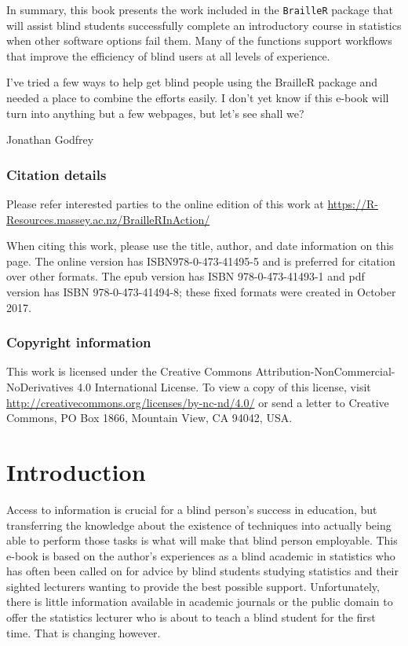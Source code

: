 \documentclass[
]{book}
\begin{document}
In summary, this book presents the work included in the \texttt{BrailleR} package that will assist blind students successfully complete an introductory course in statistics when other software options fail them. Many of the functions support workflows that improve the efficiency of blind users at all levels of experience.

I've tried a few ways to help get blind people using the BrailleR package and needed a place to combine the efforts easily. I don't yet know if this e-book will turn into anything but a few webpages, but let's see shall we?

Jonathan Godfrey

\hypertarget{citation-details}{%
\subsection*{Citation details}\label{citation-details}}

Please refer interested parties to the online edition of this work at \url{https://R-Resources.massey.ac.nz/BrailleRInAction/}

When citing this work, please use the title, author, and date information on this page. The online version has ISBN978-0-473-41495-5 and is preferred for citation over other formats. The epub version has ISBN 978-0-473-41493-1 and pdf version has ISBN 978-0-473-41494-8; these fixed formats were created in October 2017.

\hypertarget{copyright-information}{%
\subsection*{Copyright information}\label{copyright-information}}

This work is licensed under the Creative Commons Attribution-NonCommercial-NoDerivatives 4.0 International License. To view a copy of this license, visit \url{http://creativecommons.org/licenses/by-nc-nd/4.0/} or send a letter to Creative Commons, PO Box 1866, Mountain View, CA 94042, USA.

\hypertarget{introduction}{%
\chapter{Introduction}\label{introduction}}

Access to information is crucial for a blind person's success in education, but transferring the knowledge about the existence of techniques into actually being able to perform those tasks is what will make that blind person employable. This e-book is based on the author's experiences as a blind academic in statistics who has often been called on for advice by blind students studying statistics and their sighted lecturers wanting to provide the best possible support. Unfortunately, there is little information available in academic journals or the public domain to offer the statistics lecturer who is about to teach a blind student for the first time. That is changing however.
\end{document}
